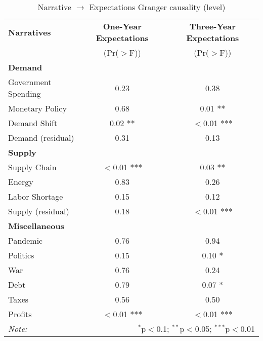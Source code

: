 \begin{table}[ht]
\centering
\caption{Narrative $\rightarrow$ Expectations Granger causality (level)}\label{tab:granger}

\begin{tabular}{lcc}
\toprule
\textbf{Narratives} & \textbf{One-Year Expectations} & \textbf{Three-Year Expectations} \\
& (Pr($>$F)) & (Pr($>$F)) \\
\midrule
\multicolumn{3}{l}{\textbf{Demand}} \\
\midrule
Government Spending & 0.23 & 0.38 \\
Monetary Policy & 0.68 & 0.01 ** \\
Demand Shift & 0.02 ** & $<$0.01 *** \\
Demand (residual) & 0.31 & 0.13 \\
\midrule
\multicolumn{3}{l}{\textbf{Supply}} \\
\midrule
Supply Chain & $<$0.01 *** & 0.03 ** \\
Energy & 0.83 & 0.26 \\
Labor Shortage & 0.15 & 0.12 \\
Supply (residual) & 0.18 & $<$0.01 *** \\
\midrule
\multicolumn{3}{l}{\textbf{Miscellaneous}} \\
\midrule
Pandemic & 0.76 & 0.94 \\
Politics & 0.15 & 0.10 * \\
War & 0.76 & 0.24 \\
Debt & 0.79 & 0.07 * \\
Taxes & 0.56 & 0.50 \\
Profits & $<$0.01 *** & $<$0.01 *** \\
\midrule
\bottomrule
\textit{Note:}  & \multicolumn{2}{r}{$^{*}$p$<$0.1; $^{**}$p$<$0.05; $^{***}$p$<$0.01} \\
\bottomrule
\end{tabular}
\end{table}
